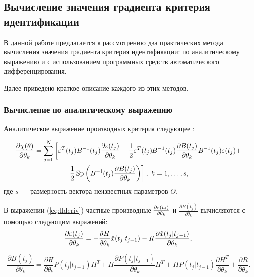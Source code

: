 \documentclass[a4paper,14pt]{extarticle}
\DeclareMathOperator{\Sp}{Sp}
\let\oldref\ref
\renewcommand{\ref}[1]{(\oldref{#1})}
\begin{document}
\subsection[Вычисление значения градиента критерия идентификации]
{Вычисление значения градиента критерия \\идентификации}

В данной работе предлагается к рассмотрению два практических метода вычисления
значения градиента критерия идентификации: по аналитическому выражению и с
использованием программных средств автоматического дифференцирования.

Далее приведено краткое описание каждого из этих методов.

\subsubsection{Вычисление по аналитическому выражению}


Аналитическое выражение производных критерия следующее \cite{denisov}:

\begin{multline}
	\label{eq:llderiv}
	\frac{\partial \chi(\theta)}{\partial \theta_k} = \sum\limits^{N}_{j=1}
	\left[
	\eps^{T}(t_j) B^{-1}(t_j) \frac{\partial \eps(t_j)}{\partial \theta_k} -
	\frac{1}{2} \eps^{T}(t_j) B^{-1}(t_j) \frac{\partial B(t_j)}
	{\partial \theta_k}
	B^{-1}(t_j) \eps(t_j) + \right.\\\left.
	\frac{1}{2}
	\Sp \left( B^{-1}(t_j) \frac{\partial B(t_j)}{\partial \theta_k} \right)
	\right] ,\ k = 1,\ldots,s,
\end{multline}
где $s$ --- размерность вектора неизвестных параметров $\Theta$.

В выражении \ref{eq:llderiv} частные производные $\frac{\partial \varepsilon(t_j)}
{\partial \theta_k}$ и $\frac{\partial B(t_j)}{\partial \theta_k}$ вычисляются
с помощью следующим выражений:
\begin{equation}
\frac{\partial \varepsilon(t_j)}{\partial \theta_k} = - \frac{\partial H}
{\partial \theta_k} \hat{x}(t_j|t_{j-1}) - H \frac{\partial 
	\hat{x}(t_j|t_{j-1})}
{\partial \theta_k},\\
\end{equation}

\begin{equation}
\frac{\partial B(t_j)}{\partial \theta_k} = \frac{\partial H}
	{\partial \theta_k}
P(t_j|t_{j-1}) H^T + H \frac{\partial P(t_j|t_{j-1})}{\partial \theta_k} H^T +
H P(t_j|t_{j-1}) \frac{\partial H^T}{\partial \theta_k} + \frac{\partial R}
{\partial \theta_k}.
\end{equation}
\end{document}
